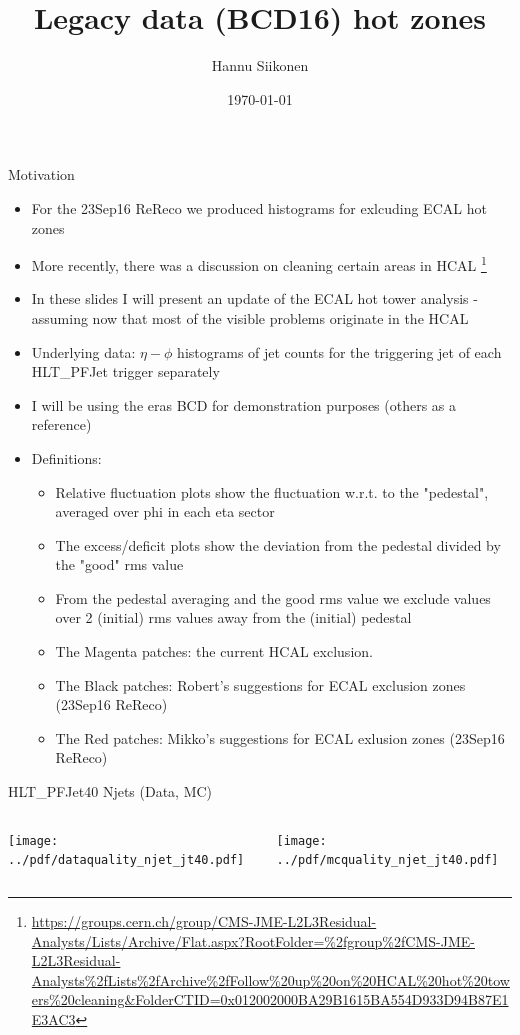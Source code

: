 \documentclass[9pt]{beamer}
\title[Legacy data (BCD16) hot zones]{Legacy data (BCD16) hot zones}
\author{Hannu Siikonen}
\institute{Helsinki Institute of Physics \\ \vspace{0.25cm} Instructor Adj.~Prof.~Mikko~Voutilainen}
\date{\today}
\begin{document}
\begin{frame}[t]
\titlepage
\end{frame}

\begin{frame}[t]{Motivation}
\begin{itemize}
 \item For the 23Sep16 ReReco we produced histograms for exlcuding ECAL hot zones
 \item More recently, there was a discussion on cleaning certain areas in HCAL \footnote{\url{https://groups.cern.ch/group/CMS-JME-L2L3Residual-Analysts/Lists/Archive/Flat.aspx?RootFolder=\%2fgroup\%2fCMS-JME-L2L3Residual-Analysts\%2fLists\%2fArchive\%2fFollow\%20up\%20on\%20HCAL\%20hot\%20towers\%20cleaning&FolderCTID=0x012002000BA29B1615BA554D933D94B87E1E3AC3}}
 \item In these slides I will present an update of the ECAL hot tower analysis - assuming now that most of the visible problems originate in the HCAL
 \item Underlying data: $\eta - \phi$ histograms of jet counts for the triggering jet of each HLT\_PFJet\* trigger separately
 \item I will be using the eras BCD for demonstration purposes (others as a reference)
 \item Definitions:
 \begin{itemize}
 \item Relative fluctuation plots show the fluctuation w.r.t. to the "pedestal", averaged over phi in each eta sector
 \item The excess/deficit plots show the deviation from the pedestal divided by the "good" rms value
 \item From the pedestal averaging and the good rms value we exclude values over 2 (initial) rms values away from the (initial) pedestal
 \item The Magenta patches: the current HCAL exclusion.
 \item The Black patches: Robert's suggestions for ECAL exclusion zones (23Sep16 ReReco)
 \item The Red patches: Mikko's suggestions for ECAL exlusion zones  (23Sep16 ReReco)
 \end{itemize}
\end{itemize}
\end{frame}

\begin{frame}[t]{HLT\_PFJet40 Njets (Data, MC)}
\begin{columns}[T]
  \begin{column}{.5\textwidth}
  \texttt{[image: ../pdf/dataquality\_njet\_jt40.pdf]}
  \end{column}
  \begin{column}{.5\textwidth}
  \texttt{[image: ../pdf/mcquality\_njet\_jt40.pdf]}
  \end{column}
\end{columns}
\end{frame}
\end{document}
